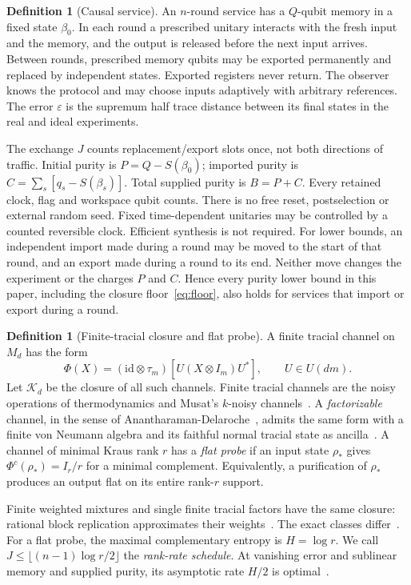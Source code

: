 \documentclass[11pt]{article}
\theoremstyle{definition}
\newtheorem{definition}[lemma]{Definition}
\theoremstyle{remark}
\newcommand{\id}{\mathrm{id}}
\newcommand{\K}{\mathcal K}
\newcommand{\eps}{\varepsilon}
\begin{document}
\begin{definition}[Causal service]
An $n$-round service has a $Q$-qubit memory in a fixed state $\beta_0$. In each round a prescribed unitary interacts with the fresh input and the memory, and the output is released before the next input arrives. Between rounds, prescribed memory qubits may be exported permanently and replaced by independent states. Exported registers never return. The observer knows the protocol and may choose inputs adaptively with arbitrary references. The error $\eps$ is the supremum half trace distance between its final states in the real and ideal experiments.
\end{definition}

The exchange $J$ counts replacement/export slots once, not both directions of traffic. Initial purity is $P=Q-S(\beta_0)$; imported purity is $C=\sum_s[q_s-S(\beta_s)]$. Total supplied purity is $B=P+C$. Every retained clock, flag and workspace qubit counts. There is no free reset, postselection or external random seed. Fixed time-dependent unitaries may be controlled by a counted reversible clock. Efficient synthesis is not required. For lower bounds, an independent import made during a round may be moved to the start of that round, and an export made during a round to its end. Neither move changes the experiment or the charges $P$ and $C$. Hence every purity lower bound in this paper, including the closure floor~\eqref{eq:floor}, also holds for services that import or export during a round.

\begin{definition}[Finite-tracial closure and flat probe]
A finite tracial channel on $M_d$ has the form
\[
 \Phi(X)=(\id\otimes\tau_m)[U(X\otimes I_m)U^*],\qquad U\in U(dm).
\]
Let $\K_d$ be the closure of all such channels. Finite tracial channels are the noisy operations of thermodynamics and Musat's $k$-noisy channels~\cite{Musat}. A \emph{factorizable} channel, in the sense of Anantharaman-Delaroche~\cite{AnantharamanDelaroche}, admits the same form with a finite von Neumann algebra and its faithful normal tracial state as ancilla~\cite[Theorem~2.2]{HM2011}. A channel of minimal Kraus rank $r$ has a \emph{flat probe} if an input state $\rho_*$ gives $\Phi^c(\rho_*)=I_r/r$ for a minimal complement. Equivalently, a purification of $\rho_*$ produces an output flat on its entire rank-$r$ support.
\end{definition}

Finite weighted mixtures and single finite tracial factors have the same closure: rational block replication approximates their weights~\cite[Proposition~3.8(ii)]{Musat}. The exact classes differ~\cite[Propositions~3.6 and~3.8(i)]{Musat}. For a flat probe, the maximal complementary entropy is $H=\log r$. We call $J\le\lfloor(n-1)\log r/2\rfloor$ the \emph{rank-rate schedule}. At vanishing error and sublinear memory and supplied purity, its asymptotic rate $H/2$ is optimal~\cite[Corollary~3.3(a)]{Memory}.
\end{document}
